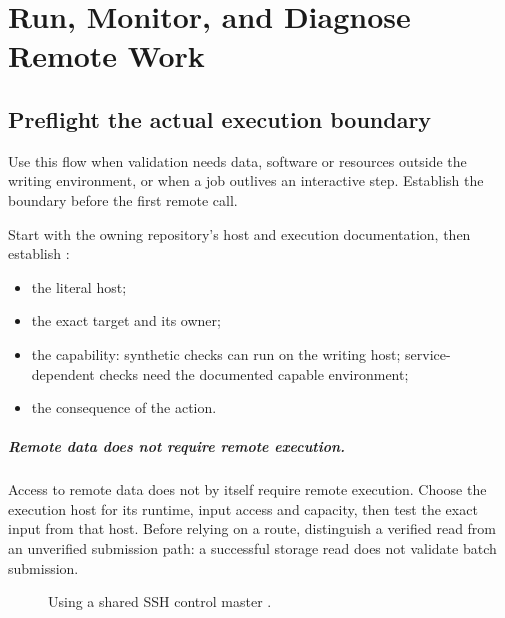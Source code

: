 \chapter{Run, Monitor, and Diagnose Remote Work}\label{ch:remote}
\section{Preflight the actual execution boundary}

\begin{headline}
  Use this flow when validation needs data, software or resources outside the writing
  environment, or when a job outlives an interactive step. Establish the boundary before
  the first remote call.
\end{headline}

Start with the owning repository's host and execution documentation, then establish
\cite[Remote execution and interruption]{skill:remote}:
\begin{itemize}
  \item the literal host;
  \item the exact target and its owner;
  \item the capability: synthetic checks can run on the writing host; service-dependent checks
        need the documented capable environment;
  \item the consequence of the action.
\end{itemize}

\paragraph{Remote data does not require remote execution.} Access to remote data does not
by itself require remote execution. Choose the execution host for its runtime, input
access and capacity, then test the exact input from that host. Before relying on a route,
distinguish a verified read from an unverified submission path: a successful storage read
does not validate batch submission.


\begin{figure}[H]
  \centering
  \caption{Using a shared SSH control master \cite[SSH control masters]{skill:remote}.}
  \label{fig:remote-ssh}
\end{figure}

